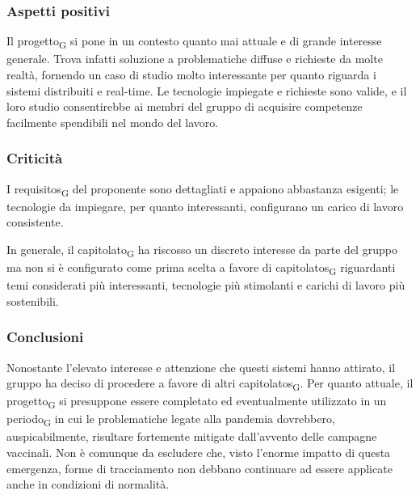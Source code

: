 	
	
\subsubsection{Aspetti positivi}

Il \gls{progetto}\textsubscript{G} si pone in un contesto quanto mai attuale e di grande interesse generale. Trova infatti soluzione a problematiche diffuse e richieste da molte realtà, fornendo un caso di studio molto interessante per quanto riguarda i sistemi distribuiti e real-time. Le tecnologie impiegate e richieste sono valide, e il loro studio consentirebbe ai membri del gruppo di acquisire competenze facilmente spendibili nel mondo del lavoro.



\subsubsection{Criticità}

I \glspl{requisito}\textsubscript{G} del proponente sono dettagliati e appaiono abbastanza esigenti; le tecnologie da impiegare, per quanto interessanti, configurano un carico di lavoro consistente.

In generale, il \gls{capitolato}\textsubscript{G} ha riscosso un discreto interesse da parte del gruppo ma non si è configurato come prima scelta a favore di \glspl{capitolato}\textsubscript{G} riguardanti temi considerati più interessanti, tecnologie più stimolanti e carichi di lavoro più sostenibili. 



\subsubsection{Conclusioni}

Nonostante l'elevato interesse e attenzione che questi sistemi hanno attirato, il gruppo ha deciso di procedere a favore di altri \glspl{capitolato}\textsubscript{G}.
Per quanto attuale, il \gls{progetto}\textsubscript{G} si presuppone essere completato ed eventualmente utilizzato in un \gls{periodo}\textsubscript{G} in cui le problematiche legate alla pandemia dovrebbero, auspicabilmente, risultare fortemente mitigate dall'avvento delle campagne vaccinali. Non è comunque da escludere che, visto l'enorme impatto di questa emergenza, forme di tracciamento non debbano continuare ad essere applicate anche in condizioni di normalità.




